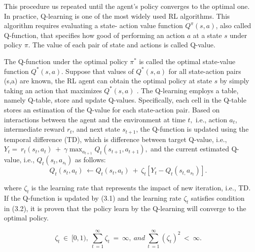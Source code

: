 \documentclass[letterpaper%
, twoside%
, 12pt%
,thesepararticles%
, english%
,creativecommons,hyperref, withAlgo2e%
]{thETS}
\begin{document}
\begin{enumerate}
\begin{enumerate}
{This procedure us repeated until the agent's policy converges to the optimal one. In practice, Q-learning is one of the most widely used RL algorithms. This algorithm requires evaluating a state- action value function $\displaystyle Q^{\pi }( s,a)$, also called Q-function, that specifies how good of performing an action $\displaystyle a$ at a state $\displaystyle s$ under policy $\displaystyle \pi $. The value of each pair of state and actions is called Q-value. 

The Q-function under the optimal policy $\displaystyle \pi ^{*}$ is called the optimal state-value function $\displaystyle Q^{*}( s,a)$. Suppose that values of $\displaystyle Q^{*}( s,a)$ for all state-action pairs (s,a) are known, the RL agent can obtain the optimal policy at state $\displaystyle s$ by simply taking an action that maximizes $\displaystyle Q^{*}( s,a)$ \cite{Sutton+Barto:1998}. The Q-learning employs a table, namely Q-table, store and update Q-values. Specifically, each cell in the Q-table stores an estimation of the Q-value for each state-action pair. Based on interactions between the agent and the environment at time $\displaystyle t,$ i.e., action $\displaystyle a_{t}$, intermediate reward $\displaystyle r_{t}$, and next state $\displaystyle s_{t+1}$, the Q-function is updated using the temporal difference (TD), which is difference between target Q-value, i.e., $\displaystyle Y_{t} =\ r_{t}( s_{t} ,a_{t}) \ +\ \gamma \max_{a_{t+1}} Q_{t}( s_{t+1} ,a_{t+1}) ,$ and the current estimated Q-value, i.e., $\displaystyle Q_{t}( s_{t} ,a_{s_{t}})$ as follows:
\begin{equation}
Q_{t}( s_{t} ,a_{t}) \ \leftarrow Q_{t}( s_{t} ,a_{t}) \ +\ \zeta _{t}[ Y_{t} -Q_{t}( s_{t,} a_{s_{t}})] .
\end{equation}

where $\displaystyle \zeta _{t}$ is the learning rate that represents the impact of new iteration, i.e., TD. If the Q-function is updated by (3.1) and the learning rate $\displaystyle \zeta _{t}$ satisfies condition in (3.2), it is proven that the policy learn by the Q-learning will converge to the optimal policy. \cite{zhu2021transfer}

\begin{equation}
\zeta _{t} \ \in \ [ 0,1) ,\ \sum ^{\infty }_{t\ =1} \zeta _{t} \ =\ \infty ,\ and\ \sum ^{\infty }_{t\ =1}( \zeta _{t})^{2} \ < \ \infty .
\end{equation}

}
\end{enumerate}
\end{enumerate}
\end{document}
